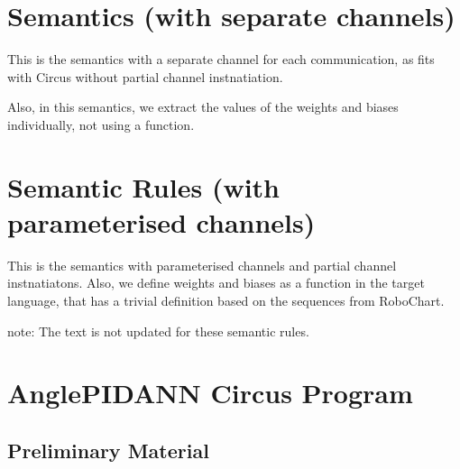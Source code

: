 \documentclass{article}
\begin{document}
\section{Semantics (with separate channels)} 

This is the semantics with a separate channel for each communication, as fits with Circus without partial channel instnatiation. 

Also, in this semantics, we extract the values of the weights and biases individually, not using a function. 



\section{Semantic Rules (with parameterised channels)} 

This is the semantics with parameterised channels and partial channel instnatiatons. Also, we define weights and biases as a function in the target language, that has a trivial definition based on the sequences from RoboChart. 

note: The text is not updated for these semantic rules.



\section{AnglePIDANN Circus Program}

\subsection{Preliminary Material}
\end{document}
